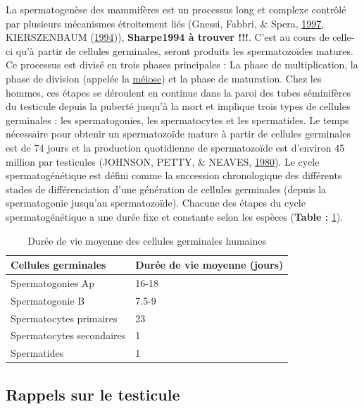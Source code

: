 \documentclass[12pt,twoside]{reedthesis}
\theoremstyle{definition}
\theoremstyle{definition}
\theoremstyle{remark}
\begin{document}
  La spermatogenèse des mammifères est un processus long et complexe
  contrôlé par plusieurs mécanismes étroitement liés (Gnessi, Fabbri, \&
  Spera, \protect\hyperlink{ref-Gnessi1997}{1997}, KIERSZENBAUM
  (\protect\hyperlink{ref-KIERSZENBAUM1994}{1994})), \textbf{Sharpe1994 à
  trouver !!!}. C'est au cours de celle-ci qu'à partir de cellules
  germinales, seront produits les spermatozoïdes matures. Ce processus est
  divisé en trois phases principales : La phase de multiplication, la
  phase de division (appelée la \protect\hyperlink{meiose}{méiose}) et la
  phase de maturation. Chez les hommes, ces étapes se déroulent en
  continue dans la paroi des tubes séminifères du testicule depuis la
  puberté jusqu'à la mort et implique trois types de cellules germinales :
  les spermatogonies, les spermatocytes et les spermatides. Le temps
  nécessaire pour obtenir un spermatozoïde mature à partir de cellules
  germinales est de 74 jours et la production quotidienne de spermatozoïde
  est d'environ 45 million par testicules (JOHNSON, PETTY, \& NEAVES,
  \protect\hyperlink{ref-Johnson1980}{1980}). Le cycle spermatogénétique
  est défini comme la succession chronologique des différents stades de
  différenciation d'une génération de cellules germinales (depuis la
  spermatogonie jusqu'au spermatozoïde). Chacune des étapes du cycle
  spermatogénétique a une durée fixe et constante selon les espèces
  (\textbf{Table : }\ref{tab:spermatotime}).
  
  \begin{table}
  
  \caption{\label{tab:spermatotime}Durée de vie moyenne des cellules germinales humaines}
  \centering
  \begin{tabular}[t]{l|l}
  \hline
  Cellules germinales & Durée de vie moyenne (jours)\\
  \hline
  Spermatogonies Ap & 16-18\\
  \hline
  Spermatogonie B & 7.5-9\\
  \hline
  Spermatocytes primaires & 23\\
  \hline
  Spermatocytes secondaires & 1\\
  \hline
  Spermatides & 1\\
  \hline
  \end{tabular}
  \end{table}
  
  \subsection{Rappels sur le testicule}\label{rappels-sur-le-testicule}
  
\end{document}
